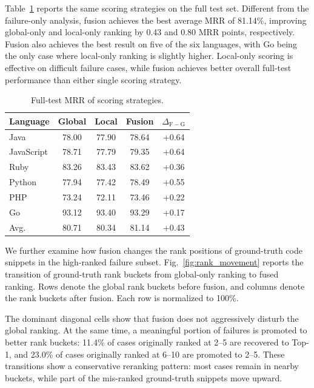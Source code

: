 \documentclass[10pt,conference]{IEEEtran}
\begin{document}
Table~\ref{tab:full_test_scoring} reports the same scoring strategies on the full test set. 
Different from the failure-only analysis, fusion achieves the best average MRR of 81.14\%, improving global-only and local-only ranking by 0.43 and 0.80 MRR points, respectively. 
Fusion also achieves the best result on five of the six languages, with Go being the only case where local-only ranking is slightly higher. 
Local-only scoring is effective on difficult failure cases, while fusion achieves better overall full-test performance than either single scoring strategy.

\begin{table}[t]
\centering
\caption{Full-test MRR of scoring strategies.}
\label{tab:full_test_scoring}
\footnotesize
\setlength{\tabcolsep}{2.0pt}
\renewcommand{\arraystretch}{1.10}
\begin{tabular*}{\columnwidth}
{@{\extracolsep{\fill}}lcccc@{}}
\toprule
Language & Global & Local & Fusion & $\Delta_{\mathrm{F-G}}$ \\
\midrule
Java       & 78.00 & 77.90 & 78.64 & +0.64 \\
JavaScript & 78.71 & 77.79 & 79.35 & +0.64 \\
Ruby       & 83.26 & 83.43 & 83.62 & +0.36 \\
Python     & 77.94 & 77.42 & 78.49 & +0.55 \\
PHP        & 73.24 & 72.11 & 73.46 & +0.22 \\
Go         & 93.12 & 93.40 & 93.29 & +0.17 \\
\midrule
Avg.       & 80.71 & 80.34 & 81.14 & +0.43 \\
\bottomrule
\end{tabular*}
\end{table}

We further examine how fusion changes the rank positions of ground-truth code snippets in the high-ranked failure subset. Fig.~\ref{fig:rank_movement} reports the transition of ground-truth rank buckets from global-only ranking to fused ranking. Rows denote the global rank buckets before fusion, and columns denote the rank buckets after fusion. Each row is normalized to 100\%.

The dominant diagonal cells show that fusion does not aggressively disturb the global ranking. At the same time, a meaningful portion of failures is promoted to better rank buckets: 11.4\% of cases originally ranked at 2--5 are recovered to Top-1, and 23.0\% of cases originally ranked at 6--10 are promoted to 2--5. These transitions show a conservative reranking pattern: most cases remain in nearby buckets, while part of the mis-ranked ground-truth snippets move upward.
\end{document}
